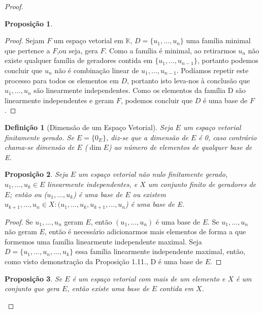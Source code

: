 \documentclass{article}
\newtheorem{proposition}{Proposição}[section]
\newtheorem{definition}{Definição}[section]
\begin{document}
\begin{proof}
\begin{proposition}
	\end{proposition}

	\begin{proof}
		Sejam $F$ um espaço vetorial em $\mathbb{K}$, $D=\{u_1,\dots,u_n\}$ uma família minimal que pertence a $F$,ou seja, gera $F$.
		Como a família é minimal, ao retirarmos $u_n$ não existe qualquer família de geradores contida em $\{
		u_1,\dots,u_{n-1}\}$, portanto podemos concluir que $u_n$ não é combinação linear de $u_1,\dots,u_{n-1}$. Podíamos repetir este processo para todos os elementos em $D$, portanto isto leva-nos à conclusão que $u_1,\dots,u_n$ são linearmente independentes. Como os elementos da família D são linearmente independentes e geram $F$, podemos concluir que $D$ é uma base de $F$.
		\end{proof}

	\begin{definition}[Dimensão de um Espaço Vetorial]
		Seja $E$ um espaço vetorial finitamente gerado. Se $E=\{0_E\}$, diz-se que a dimensão de $E$ é 0, caso contrário chama-se dimensão de $E$ ($\dim E$) ao número de elementos de qualquer base de E.
	\end{definition}

	\begin{proposition}
		Seja $E$ um espaço vetorial não nulo finitamente gerado, $u_1,\dots,u_k \in E$ linearmente independentes, e $X$ um conjunto finito de geradores de $E$; então ou ($u_1,\dots,u_k$) é uma base de $E$ ou existem $u_{k+1},\dots,u_n \in X: (u_1,\dots,u_k,u_{k+1},\dots,u_n$) é uma base de E.

	\end{proposition}

	\begin{proof}
		Se $u_1,\dots,u_n$ geram $E$, então $(u_1,\dots,u_n)$ é uma base de $E$.
		Se $u_1,\dots,u_n$ não geram $E$, então é necessário adicionarmos mais elementos de forma a que formemos uma família linearmente independente maximal. Seja $D=\{u_1,\dots,u_n,\dots,u_k\}$ essa família linearmente independente maximal, então, como visto demonstração da Proposição 1.11., D é uma base de $E$.
	\end{proof}

	\begin{proposition}
		Se $E$ é um espaço vetorial com mais de um elemento e $X$ é um conjunto que gera $E$, então existe uma base de $E$ contida em $X$.


\end{proposition}
\end{proof}
\end{document}
